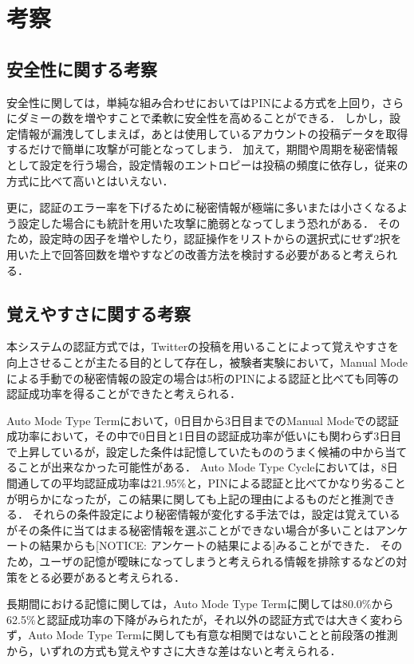 \chapter{考察}\label{chap:discussion}
\section{安全性に関する考察}\label{sec:safety}
安全性に関しては，単純な組み合わせにおいてはPINによる方式を上回り，さらにダミーの数を増やすことで柔軟に安全性を高めることができる．
しかし，設定情報が漏洩してしまえば，あとは使用しているアカウントの投稿データを取得するだけで簡単に攻撃が可能となってしまう．
加えて，期間や周期を秘密情報として設定を行う場合，設定情報のエントロピーは投稿の頻度に依存し，従来の方式に比べて高いとはいえない．

更に，認証のエラー率を下げるために秘密情報が極端に多いまたは小さくなるよう設定した場合にも統計を用いた攻撃に脆弱となってしまう恐れがある．
そのため，設定時の因子を増やしたり，認証操作をリストからの選択式にせず2択を用いた上で回答回数を増やすなどの改善方法を検討する必要があると考えられる．

\section{覚えやすさに関する考察}\label{sec:memorable}
本システムの認証方式では，Twitterの投稿を用いることによって覚えやすさを向上させることが主たる目的として存在し，被験者実験において，Manual Modeによる手動での秘密情報の設定の場合は5桁のPINによる認証と比べても同等の認証成功率を得ることができたと考えられる．

Auto Mode Type Termにおいて，0日目から3日目までのManual Modeでの認証成功率において，その中で0日目と1日目の認証成功率が低いにも関わらず3日目で上昇しているが，設定した条件は記憶していたもののうまく候補の中から当てることが出来なかった可能性がある．
Auto Mode Type Cycleにおいては，8日間通しての平均認証成功率は21.95\%と，PINによる認証と比べてかなり劣ることが明らかになったが，この結果に関しても上記の理由によるものだと推測できる．
それらの条件設定により秘密情報が変化する手法では，設定は覚えているがその条件に当てはまる秘密情報を選ぶことができない場合が多いことはアンケートの結果からも[NOTICE: アンケートの結果による]みることができた．
そのため，ユーザの記憶が曖昧になってしまうと考えられる情報を排除するなどの対策をとる必要があると考えられる．

長期間における記憶に関しては，Auto Mode Type Termに関しては80.0\%から62.5\%と認証成功率の下降がみられたが，それ以外の認証方式では大きく変わらず，Auto Mode Type Termに関しても有意な相関ではないことと前段落の推測から，いずれの方式も覚えやすさに大きな差はないと考えられる．

